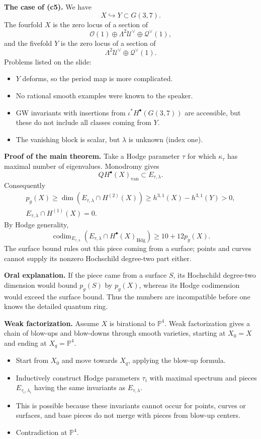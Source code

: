 \medskip\noindent
\textbf{The case of (c5).}
We have
$$
X\hookrightarrow Y\subset G(3,7).
$$
The fourfold $X$ is the zero locus of a
section of
$$
\mathcal O(1)\oplus\Lambda^2\mathcal U^\vee
\oplus\mathcal Q^\vee(1),
$$
and the fivefold $Y$ is the zero locus of a
section of
$$
\Lambda^2\mathcal U^\vee
\oplus\mathcal Q^\vee(1).
$$
Problems listed on the slide:
\begin{itemize}
\item $Y$ deforms, so the period map is
more complicated.
\item No rational smooth examples were
known to the speaker.
\item GW invariants with insertions from
$\iota^*H^\bullet(G(3,7))$ are accessible,
but these do not include all classes
coming from $Y$.
\item The vanishing block is scalar, but
$\lambda$ is unknown (index one).
\end{itemize}

\medskip\noindent
\textbf{Proof of the main theorem.}
Take a Hodge parameter $\tau$ for which
$\kappa_\tau$ has maximal number of
eigenvalues. Monodromy gives
$$
QH^\bullet(X)_{\mathrm{van}}
\subset E_{\tau,\lambda}.
$$
Consequently
$$
\begin{gathered}
p_g(X)\geq
\dim(E_{\tau,\lambda}\cap H^{(2)}(X))
\geq h^{3,1}(X)-h^{3,1}(Y)>0,\\
E_{\tau,\lambda}\cap H^{(1)}(X)=0.
\end{gathered}
$$
By Hodge generality,
$$
\operatorname{codim}_{E_{\tau,\lambda}}
(E_{\tau,\lambda}\cap
H^\bullet(X)_{\mathrm{Hdg}})
\geq10+12p_g(X).
$$
The surface bound rules out this piece
coming from a surface; points and curves
cannot supply its nonzero Hochschild
 degree-two part either.

\textbf{Oral explanation.}
If the piece came from a surface $S$, its
Hochschild degree-two dimension would bound
$p_g(S)$ by $p_g(X)$, whereas its Hodge
codimension would exceed the surface bound.
Thus the numbers are incompatible before
one knows the detailed quantum ring.

\medskip\noindent
\textbf{Weak factorization.}
Assume $X$ is birational to $\mathbb P^4$.
Weak factorization gives a chain of
blow-ups and blow-downs through smooth
varieties, starting at $X_0=X$ and ending
at $X_q=\mathbb P^4$.
\begin{itemize}
\item Start from $X_0$ and move towards
$X_q$, applying the blow-up formula.
\item Inductively construct Hodge parameters
$\tau_i$ with maximal spectrum and pieces
$E_{\tau_i,\lambda_i}$ having the same
invariants as $E_{\tau,\lambda}$.
\item This is possible because these
invariants cannot occur for points, curves
or surfaces, and base pieces do not merge
with pieces from blow-up centers.
\item Contradiction at $\mathbb P^4$.
\end{itemize}

